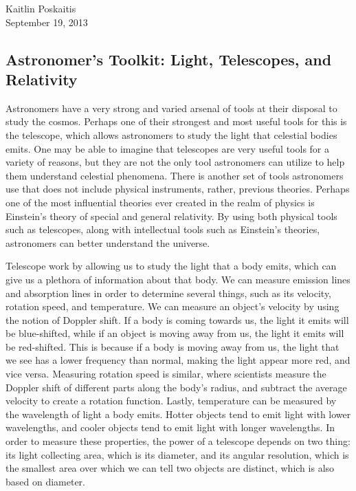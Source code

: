 \documentclass[12pt]{article}
\begin{document}
\noindent Kaitlin Poskaitis\\
September 19, 2013
\begin{center}
\section*{\bf Astronomer’s Toolkit: Light, Telescopes, and Relativity}
\end{center}

Astronomers have a very strong and varied arsenal of tools at their disposal to
study the cosmos.  Perhaps one of their strongest and most useful tools for this
is the telescope, which allows astronomers to study the light that celestial
bodies emits.  One may be able to imagine that telescopes are very useful tools
for a variety of reasons, but they are not the only tool astronomers can utilize
to help them understand celestial phenomena.  There is another set of tools
astronomers use that does not include physical instruments, rather, previous
theories.  Perhaps one of the most influential theories ever created in the
realm of physics is Einstein's theory of special and general relativity.  By
using both physical tools such as telescopes, along with intellectual tools such
as Einstein's theories, astronomers can better understand the universe.

Telescope work by allowing us to study the light that a body emits, which can
give us a plethora of information about that body.  We can measure emission
lines and absorption lines in order to determine several things, such as its
velocity, rotation speed, and temperature.  We can measure an object's velocity
by using the notion of Doppler shift.  If a body is coming towards us, the light
it emits will be blue-shifted, while if an object is moving away from us, the
light it emits will be red-shifted.  This is because if a body is moving away
from us, the light that we see has a lower frequency than normal, making the
light appear more red, and vice versa.  Measuring rotation speed is similar,
where scientists measure the Doppler shift of different parts along the body's
radius, and subtract the average velocity to create a rotation function.
Lastly, temperature can be measured by the wavelength of light a body emits.
Hotter objects tend to emit light with lower wavelengths, and cooler objects
tend to emit light with longer wavelengths.  In order to measure these
properties, the power of a telescope depends on two thing: its light collecting
area, which is its diameter, and its angular resolution, which is the smallest
area over which we can tell two objects are distinct, which is also based on
diameter.
\end{document}
